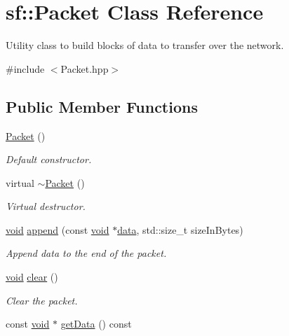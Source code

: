 \hypertarget{classsf_1_1_packet}{\section{sf\-:\-:Packet Class Reference}
\label{classsf_1_1_packet}
}


Utility class to build blocks of data to transfer over the network.  




{\ttfamily \#include $<$Packet.\-hpp$>$}

\subsection*{Public Member Functions}
\begin{DoxyCompactItemize}
\item 
\hyperlink{classsf_1_1_packet_a786e5d4ced83992ceefa1799963ea858}{Packet} ()
\begin{DoxyCompactList}\small\item\em Default constructor. \end{DoxyCompactList}\item 
virtual \hyperlink{classsf_1_1_packet_adc0490ca3c7c3d1e321bd742e5213913}{$\sim$\-Packet} ()
\begin{DoxyCompactList}\small\item\em Virtual destructor. \end{DoxyCompactList}\item 
\hyperlink{glutf90_8h_ac778d6f63f1aaf8ebda0ce6ac821b56e}{void} \hyperlink{classsf_1_1_packet_a7dd6e429b87520008326c4d71f1cf011}{append} (const \hyperlink{glutf90_8h_ac778d6f63f1aaf8ebda0ce6ac821b56e}{void} $\ast$\hyperlink{gl3_8h_a0f78eecb0891cce3bdfc815b971866a1}{data}, std\-::size\-\_\-t size\-In\-Bytes)
\begin{DoxyCompactList}\small\item\em Append data to the end of the packet. \end{DoxyCompactList}\item 
\hyperlink{glutf90_8h_ac778d6f63f1aaf8ebda0ce6ac821b56e}{void} \hyperlink{classsf_1_1_packet_a133ea8b8fe6e93c230f0d79f19a3bf0d}{clear} ()
\begin{DoxyCompactList}\small\item\em Clear the packet. \end{DoxyCompactList}\item 
const \hyperlink{glutf90_8h_ac778d6f63f1aaf8ebda0ce6ac821b56e}{void} $\ast$ \hyperlink{classsf_1_1_packet_a304ba9ec94c992710f4dfff879c6340e}{get\-Data} () const 

\end{DoxyCompactItemize}

